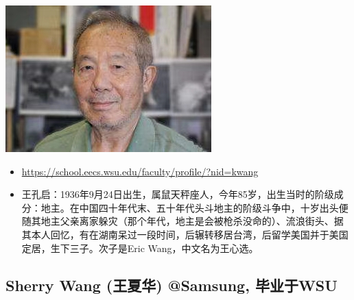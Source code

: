 \documentclass[9pt, b5paper]{article}
\begin{document}
\begin{center}
\includegraphics[width=.9\linewidth]{./pic/KCWang.jpg}
\end{center}
\begin{itemize}
\item \url{https://school.eecs.wsu.edu/faculty/profile/?nid=kwang}
\item 王孔启：1936年9月24日出生，属鼠天秤座人，今年85岁，出生当时的阶级成分：地主。在中国四十年代末、五十年代头斗地主的阶级斗争中，十岁出头便随其地主父亲离家躲灾（那个年代，地主是会被枪杀没命的）、流浪街头、据其本人回忆，有在湖南呆过一段时间，后辗转移居台湾，后留学美国并于美国定居，生下三子。次子是Eric Wang，中文名为王心选。
\end{itemize}
\subsection{Sherry Wang (王夏华) @Samsung, 毕业于WSU}
\label{sec:org42bfdfa}
\end{document}
